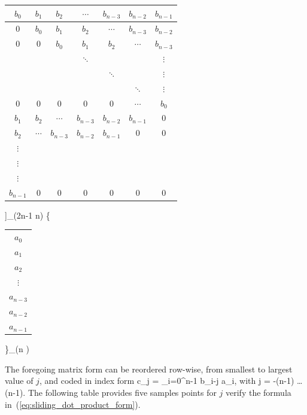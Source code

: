 \begin{tabular}{ccccccc}
$b_0$ & 
$b_1$ & 
$b_2$ & 
$\cdots$ & 
$b_{n-3}$ & 
$b_{n-2}$ & 
$b_{n-1}$  
 \\
 \hline
0 & 
$b_0$ & 
$b_1$ & 
$b_2$ & 
$\cdots$ & 
$b_{n-3}$ & 
$b_{n-2}$ 
 \\
0 & 
0 & 
$b_0$ & 
$b_1$ & 
$b_2$ & 
$\cdots$ & 
$b_{n-3}$ 
 \\
 & 
 & 
 & 
$\ddots$ & 
 & 
 & 
$\vdots$ 
\\
 & 
 & 
 & 
 & 
$\ddots$ & 
 & 
$\vdots$ 
 \\
 & 
 & 
 & 
 & 
 & 
$\ddots$ & 
$\vdots$ 
 \\
0 & 
0 & 
0 & 
0  & 
0 & 
$\cdots$ & 
$b_0$ 
 \\ \hline
$b_1$ & 
$b_2$ & 
$\cdots$ & 
$b_{n-3}$ & 
$b_{n-2}$ & 
$b_{n-1}$ & 
0 
\\
$b_2$ & 
$\cdots$ & 
$b_{n-3}$ & 
$b_{n-2}$ & 
$b_{n-1}$ & 
0 & 
0
\\
$\vdots$ & 
& 
& 
{$\ddots$} & 
& 
& 

\\
$\vdots$ & 
 & 
{$\ddots$} & 
 & 
 & 
 & 
\\
$\vdots$ & 
{$\ddots$} & 
 & 
 & 
 & 
 & 
 
\\
$b_{n-1}$ & 
0 & 
0 & 
0 & 
0 & 
0 & 
0 
\end{tabular}
\right]_{(2n-1 \times n)}
\left\{
\begin{tabular}{c}
$a_0$ \\ 
$a_1$ \\ 
$a_2$ \\ 
$\vdots$ \\ 
$a_{n-3}$ \\ 
$a_{n-2}$ \\ 
$a_{n-1}$ \\ 
\end{tabular}
\right\}_{(n )}
\ee

The foregoing matrix form can be
reordered row-wise, from smallest to largest
value of $j$, and coded in index form
\be
c_j = \sum_{i=0}^{n-1} \; b_{i-j} \; a_i,  \hspace{0.5cm} 
\mbox{with} \; j = -(n-1) \ldots (n-1).
\label{eq:sliding_dot_product_form}
\ee
The following table provides
five samples points for $j$ verify the
formula
in~(\ref{eq:sliding_dot_product_form}).

